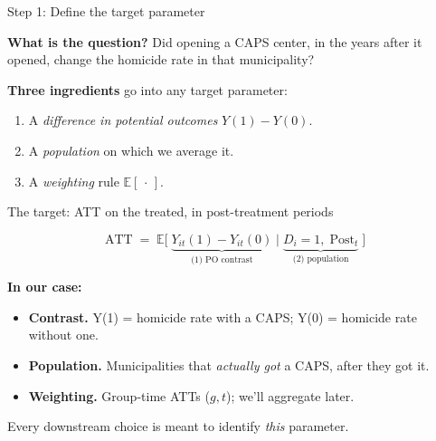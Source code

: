 \documentclass[aspectratio=169,12pt,t]{beamer}
\begin{document}
\begin{frame}{Step 1: Define the target parameter}
\vspace{0.6cm}

\textbf{What is the question?} \;Did opening a CAPS center, in the years after it opened, change the homicide rate in that municipality?

\vspace{0.5cm}

\textbf{Three ingredients} go into any target parameter:
\vspace{0.3cm}
\begin{enumerate}\setlength\itemsep{4pt}
  \item A \textit{difference in potential outcomes} \;$Y(1) - Y(0)$.
  \item A \textit{population} on which we average it.
  \item A \textit{weighting} rule \;$\mathbb{E}[\,\cdot\,]$.
\end{enumerate}

\vspace{0.5em}
\end{frame}

\begin{frame}{The target: ATT on the treated, in post-treatment periods}
\vspace{0.3cm}

\[
\text{ATT} \;=\; \mathbb{E}\Big[\;\underbrace{Y_{it}(1) - Y_{it}(0)}_{\text{(1) PO contrast}}\;\Big|\;\underbrace{D_i = 1,\;\text{Post}_t}_{\text{(2) population}}\;\Big]
\]

\vspace{0.35cm}

\textbf{In our case:}
\begin{itemize}\small\setlength\itemsep{0pt}
  \item \textbf{Contrast.} \;Y(1) = homicide rate with a CAPS; Y(0) = homicide rate without one.
  \item \textbf{Population.} \;Municipalities that \textit{actually got} a CAPS, after they got it.
  \item \textbf{Weighting.} \;Group-time ATTs ($g,t$); we'll aggregate later.
\end{itemize}

\vspace{0.3em}
 \;Every downstream choice is meant to identify \textit{this} parameter.
\end{frame}
\end{document}
